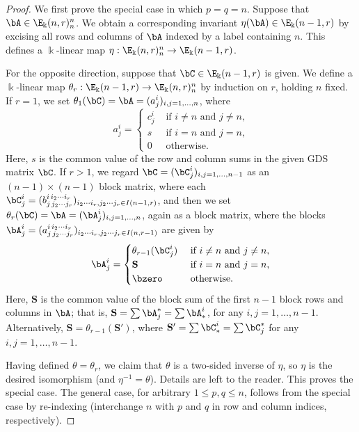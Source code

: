 \begin{proof}
We first prove the special case in which $p=q=n$. Suppose that $\bA
\in \E_\Bbbk(n,r)^n_n$. We obtain a corresponding invariant
$\eta(\bA) \in \E_\Bbbk(n-1,r)$ by excising all rows and columns of
$\bA$ indexed by a label containing $n$. This defines a $\Bbbk$-linear
map $\eta: \E_\Bbbk(n,r)^n_n \to \E_\Bbbk(n-1,r)$.

For the opposite direction, suppose that $\bC \in \E_\Bbbk(n-1,r)$ is
given. We define a $\Bbbk$-linear map $\theta_r: \E_\Bbbk(n-1,r) \to
\E_\Bbbk(n,r)^n_n$ by induction on $r$, holding $n$ fixed. If $r=1$,
we set $\theta_1(\bC) = \bA = (a^i_j)_{i,j = 1, \dots, n}$, where
\[
a^i_j = 
\begin{cases}
 c^i_j & \text{ if $i \ne n$ and $j \ne n$,} \\
 s & \text{ if $i = n$ and $j = n$,} \\
 0 & \text{ otherwise.}
\end{cases}
\]
Here, $s$ is the common value of the row and column sums in the given
GDS matrix $\bC$. If $r>1$, we regard $\bC = (\bC^i_j)_{i,j = 1,
 \dots, n-1}$ as an $(n-1) \times (n-1)$ block matrix, where each
$\bC^i_j = (b^{i\, i_2 \cdots i_r}_{j\, j_2 \cdots j_r})_{i_2 \cdots
 i_r, j_2 \cdots j_r \in I(n-1,r)}$, and then we set $\theta_r(\bC) =
\bA = (\bA^i_j)_{i,j = 1, \dots, n}$, again as a block matrix, where
the blocks $\bA^i_j = (a^{i\, i_2 \cdots i_r}_{j\,j_2 \cdots j_r})_{i_2
 \cdots i_r, j_2 \cdots j_r \in I(n,r-1)}$ are given by
\[
\bA^i_j =
\begin{cases}
 \theta_{r-1}(\bC^i_j) & \text{ if $i \ne n$ and $j \ne n$,} \\
 \mathbf{S} & \text{ if $i=n$ and $j=n$,} \\
 \bzero & \text{ otherwise.}
\end{cases}
\]
Here, $\mathbf{S}$ is the common value of the block sum of the first
$n-1$ block rows and columns in $\bA$; that is, $\mathbf{S} = \sum
\bA^*_j = \sum \bA^i_*$, for any $i, j = 1, \dots,
n-1$. Alternatively, $\mathbf{S} = \theta_{r-1}(\mathbf{S}')$, where
$\mathbf{S}' = \sum \bC^i_* = \sum \bC^*_j$ for any $i,j = 1, \dots,
n-1$.

Having defined $\theta = \theta_r$, we claim that $\theta$ is a two-sided
inverse of $\eta$, so $\eta$ is the desired isomorphism (and
$\eta^{-1} = \theta$). Details are left to the reader. This proves
the special case. The general case, for arbitrary $1 \le p,q \le n$,
follows from the special case by re-indexing (interchange $n$ with $p$
and $q$ in row and column indices, respectively). 
\end{proof}



